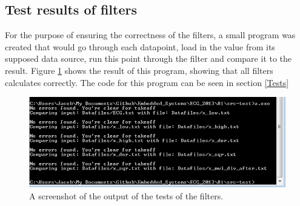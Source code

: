 \documentclass[12pt,a4paper]{article}
\begin{document}
\subsection{Test results of filters}
	For the purpose of ensuring the correctness of the filters, a small program was created that would go through each datapoint, load in the value from its supposed data source, run this point through the filter and compare it to the result. Figure \ref{test_filter_result} shows the result of this program, showing that all filters calculates correctly. The code for this program can be seen in section \ref{Tests}
	\begin{figure}[h!]
		\centering
			\includegraphics[width=1\textwidth]{Screenshots/tests_filter_result.png}
		\caption{A screenshot of the output of the tests of the filters.}
		\label{test_filter_result}
	\end{figure}
\end{document}
